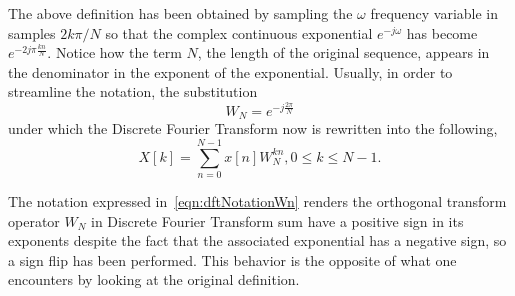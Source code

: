 \documentclass[\documentfontsize, twocolumn]{\classname}
\begin{document}
The above definition has been obtained by sampling the $\omega$ frequency variable in samples $2k\pi / N$ so that the complex continuous exponential $e^{-j\omega}$ has become $e^{-2j\pi \frac{kn}{N}}$. Notice how the term $N$, the length of the original sequence, appears in the denominator in the exponent of the exponential. Usually, in order to streamline the notation, the substitution
\begin{equation}\label{eqn:dftNotationWn}
    W_N = e^{-j\frac{2\pi}{N}}
\end{equation}
under which the Discrete Fourier Transform now is rewritten into the following,
\begin{equation}\label{eqn:discreteTimeFourierTransformWn}
        X[k] = \sum_{n=0}^{N-1} x[n] W_N^{kn}, 0 \leq k \leq N-1.
\end{equation}

The notation expressed in~\ref{eqn:dftNotationWn} renders the orthogonal transform operator $W_N$ in Discrete Fourier Transform sum have a positive sign in its exponents despite the fact that the associated exponential has a negative sign, so a sign flip has been performed. This behavior is the opposite of what one encounters by looking at the original definition.
\end{document}
